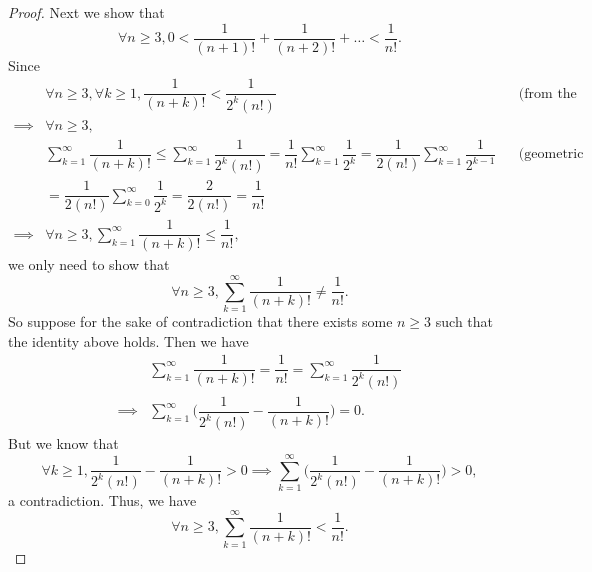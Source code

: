 \begin{proof}
  Next we show that
  \[
    \forall n \geq 3, 0 < \dfrac{1}{(n + 1)!} + \dfrac{1}{(n + 2)!} + \dots < \dfrac{1}{n!}.
  \]
  Since
  \begin{align*}
             & \forall n \geq 3, \forall k \geq 1, \dfrac{1}{(n + k)!} < \dfrac{1}{2^k (n!)}                                                                                                                        &  & \text{(from the proof above)} \\
    \implies & \forall n \geq 3,                                                                                                                                                                                                                       \\
             & \sum_{k = 1}^\infty \dfrac{1}{(n + k)!} \leq \sum_{k = 1}^\infty \dfrac{1}{2^k (n!)} = \dfrac{1}{n!} \sum_{k = 1}^\infty \dfrac{1}{2^k} = \dfrac{1}{2 (n!)} \sum_{k = 1}^\infty \dfrac{1}{2^{k - 1}} &  & \text{(geometric series)}     \\
             & = \dfrac{1}{2 (n!)} \sum_{k = 0}^\infty \dfrac{1}{2^k} = \dfrac{2}{2 (n!)} = \dfrac{1}{n!}                                                                                                                                              \\
    \implies & \forall n \geq 3, \sum_{k = 1}^\infty \dfrac{1}{(n + k)!} \leq \dfrac{1}{n!},
  \end{align*}
  we only need to show that
  \[
    \forall n \geq 3, \sum_{k = 1}^\infty \dfrac{1}{(n + k)!} \neq \dfrac{1}{n!}.
  \]
  So suppose for the sake of contradiction that there exists some \(n \geq 3\) such that the identity above holds.
  Then we have
  \begin{align*}
             & \sum_{k = 1}^\infty \dfrac{1}{(n + k)!} = \dfrac{1}{n!} = \sum_{k = 1}^\infty \dfrac{1}{2^k (n!)} \\
    \implies & \sum_{k = 1}^\infty \bigg(\dfrac{1}{2^k (n!)} - \dfrac{1}{(n + k)!}\bigg) = 0.
  \end{align*}
  But we know that
  \[
    \forall k \geq 1, \dfrac{1}{2^k (n!)} - \dfrac{1}{(n + k)!} > 0 \implies \sum_{k = 1}^\infty \bigg(\dfrac{1}{2^k (n!)} - \dfrac{1}{(n + k)!}\bigg) > 0,
  \]
  a contradiction.
  Thus, we have
  \[
    \forall n \geq 3, \sum_{k = 1}^\infty \dfrac{1}{(n + k)!} < \dfrac{1}{n!}.
  \]


\end{proof}

